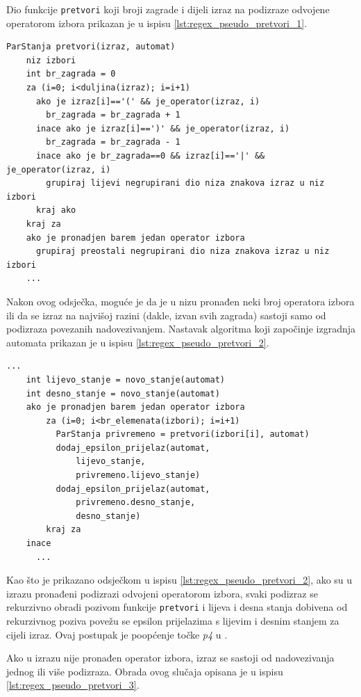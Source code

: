\documentclass[times, 12pt, utf8]{book}
\begin{document}
Dio funkcije \verb|pretvori| koji broji zagrade i dijeli izraz na podizraze odvojene operatorom izbora prikazan je u ispisu \ref{lst:regex_pseudo_pretvori_1}.

\begin{lstlisting}[caption={Početak funkcije \texttt{pretvori}.},label=lst:regex_pseudo_pretvori_1]
ParStanja pretvori(izraz, automat)
	niz izbori
	int br_zagrada = 0
	za (i=0; i<duljina(izraz); i=i+1)
	  ako je izraz[i]=='(' && je_operator(izraz, i)
	    br_zagrada = br_zagrada + 1
	  inace ako je izraz[i]==')' && je_operator(izraz, i)
	    br_zagrada = br_zagrada - 1
	  inace ako je br_zagrada==0 && izraz[i]=='|' && je_operator(izraz, i)
	    grupiraj lijevi negrupirani dio niza znakova izraz u niz izbori
	  kraj ako
	kraj za
	ako je pronadjen barem jedan operator izbora
	  grupiraj preostali negrupirani dio niza znakova izraz u niz izbori
	...
\end{lstlisting}

Nakon ovog odsječka, moguće je da je u nizu pronađen neki broj operatora izbora ili da se izraz na najvišoj razini (dakle, izvan svih zagrada) sastoji samo od podizraza povezanih nadovezivanjem.
Nastavak algoritma koji započinje izgradnja automata prikazan je u ispisu \ref{lst:regex_pseudo_pretvori_2}.

\begin{lstlisting}[caption={Nastavak funkcije \texttt{pretvori}.},label=lst:regex_pseudo_pretvori_2]
    ...
    int lijevo_stanje = novo_stanje(automat)
    int desno_stanje = novo_stanje(automat)
    ako je pronadjen barem jedan operator izbora
        za (i=0; i<br_elemenata(izbori); i=i+1)
          ParStanja privremeno = pretvori(izbori[i], automat)
          dodaj_epsilon_prijelaz(automat,
              lijevo_stanje,         
              privremeno.lijevo_stanje)
          dodaj_epsilon_prijelaz(automat,
              privremeno.desno_stanje,
              desno_stanje)
        kraj za
    inace
      ...
\end{lstlisting}

Kao što je prikazano odsječkom u ispisu \ref{lst:regex_pseudo_pretvori_2}, ako su u izrazu pronađeni podizrazi odvojeni operatorom izbora, svaki podizraz se rekurzivno obradi pozivom funkcije \verb|pretvori| i lijeva i desna stanja dobivena od rekurzivnog poziva povežu se epsilon prijelazima s lijevim i desnim stanjem za cijeli izraz.
Ovaj postupak je poopćenje točke \emph{p4} u \cite[poglavlje 2.2.2]{utr}.

Ako u izrazu nije pronađen operator izbora, izraz se sastoji od nadovezivanja jednog ili više podizraza.
Obrada ovog slučaja opisana je u ispisu \ref{lst:regex_pseudo_pretvori_3}.
\end{document}
